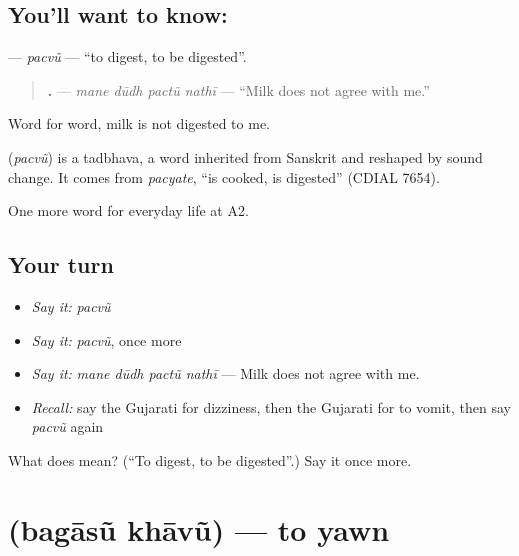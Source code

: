 \subsection*{You'll want to know: }
\textbf{} — \emph{pacvũ} — \textquotedblleft{}to digest, to be digested\textquotedblright{}.

\begin{quote}
\textbf{   .} — \emph{mane dūdh pactũ nathī} — \textquotedblleft{}Milk does not agree with me.\textquotedblright{}
\end{quote}

Word for word, milk is not digested to me.

\begin{cousinweb}
\textbf{} (\emph{pacvũ}) is a tadbhava, a word inherited from Sanskrit and reshaped by sound change. It comes from \emph{pacyate}, \textquotedblleft{}is cooked, is digested\textquotedblright{} (CDIAL 7654).
\end{cousinweb}

\begin{grammarlens}[title={What you've built}]
One more word for everyday life at A2.
\end{grammarlens}

\subsection*{Your turn}
\begin{itemize}
\raggedright
  \item \emph{Say it:} \emph{pacvũ}
  \item \emph{Say it:} \emph{pacvũ}, once more
  \item \emph{Say it:} \emph{mane dūdh pactũ nathī} — Milk does not agree with me.
  \item \emph{Recall:} say the Gujarati for dizziness, then the Gujarati for to vomit, then say \emph{pacvũ} again
\end{itemize}

\begin{tcolorbox}[breakable,colback=teal!4,colframe=teal!35!black,title={Before you move on}]
What does  mean? (\textquotedblleft{}To digest, to be digested\textquotedblright{}.) Say it once more.
\end{tcolorbox}
\section[\texorpdfstring{\gu{બગાસું} \gu{ખાવું} (bagāsũ khāvũ)}{બગાસું ખાવું (bagāsũ khāvũ)}]{  (bagāsũ khāvũ) — to yawn}

